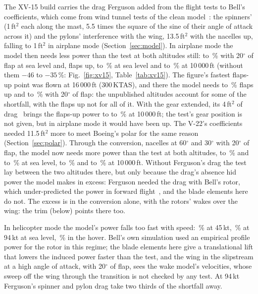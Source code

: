 \documentclass[10pt,a4paper,twocolumn]{article}
\begin{document}
The XV-15 build carries the drag Ferguson added from the flight tests to Bell's coefficients, which come from wind tunnel tests of the clean
model~\cite{gt}: the spinners' (1\,ft$^2$ each along the mast, 5.5 times the square of the sine of their angle of attack across it) and the pylons'
interference with the wing, 13.5\,ft$^2$ with the nacelles up, falling to 1\,ft$^2$ in airplane mode (Section~\ref{sec:model}). In airplane mode the
model then needs less power than the test at both altitudes still: \NXfMin{} to \NXfMax\,\% with 20$^\circ$ of flap at sea level and, flaps up,
\NXaSlMin{} to \NXaSlMax\,\% at sea level and \NXaMin{} to \NXaMax\,\% at 10\,000\,ft (without them $-46$ to $-35$\,\%: Fig.~\ref{fig:xv15},
Table~\ref{tab:xv15}). The figure's fastest flaps-up point was flown at 16\,000\,ft (300\,KTAS), and there the model needs \NXaSixMin{} to
\NXaSixMax\,\% flaps up and \NXfSixMin{} to \NXfSixMax\,\% with 20$^\circ$ of flap: the unpublished altitudes account for some of the
shortfall, with the flaps up not for all of it. With the gear extended, its 4\,ft$^2$ of drag~\cite{cr} brings the flaps-up power to \NXgMin{} to \NXgMax\,\% at 10\,000\,ft;
the test's gear position is not given, but in airplane mode it would have been up. The V-22's coefficients needed 11.5\,ft$^2$ more to meet
Boeing's polar for the same reason (Section~\ref{sec:polar}). Through the conversion, nacelles at 60$^\circ$ and 30$^\circ$ with 20$^\circ$ of flap,
the model now needs more power than the test at both altitudes, \NXsMin{} to \NXsMax\,\% and \NXcMin{} to \NXcMax\,\% at sea level, \NXsHiMin{} to
\NXsHiMax\,\% and \NXcHiMin{} to \NXcHiMax\,\% at 10\,000\,ft. Without Ferguson's drag the test lay between the two altitudes there, but only because the
drag's absence hid power the model makes in excess: Ferguson needed the drag with Bell's rotor, which under-predicted the power in forward
flight~\cite{gt}, and the blade elements here do not. The excess is in the conversion alone, with the rotors' wakes over the wing: the trim
(below) points there too.

In helicopter mode the model's power falls too fast with speed: \NXhelLo\,\% at 45\,kt, \NXhelHi\,\% at 94\,kt at sea level, \NXhover\,\% in the
hover. Bell's own simulation used an empirical profile power for the rotor in this regime; the blade elements here give a translational lift that
lowers the induced power faster than the test, and the wing in the slipstream at a high angle of attack, with 20$^\circ$ of flap, sees the wake model's
velocities, whose sweep off the wing through the transition is not checked by any test. At 94\,kt Ferguson's spinner and pylon drag take
two thirds of the shortfall away.
\end{document}
